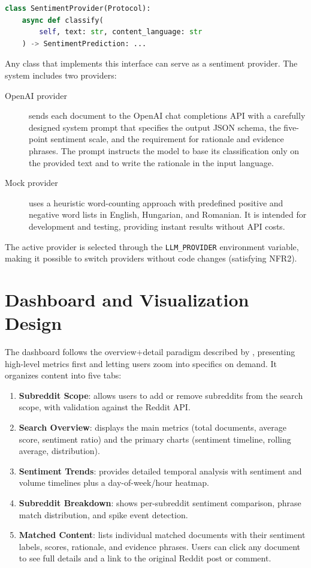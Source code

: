 \begin{lstlisting}[language=Python, caption={Sentiment provider protocol}]
class SentimentProvider(Protocol):
    async def classify(
        self, text: str, content_language: str
    ) -> SentimentPrediction: ...
\end{lstlisting}

Any class that implements this interface can serve as a sentiment provider. The system includes two providers:

\begin{description}
    \item[OpenAI provider] sends each document to the OpenAI chat completions API with a carefully designed system prompt that specifies the output JSON schema, the five-point sentiment scale, and the requirement for rationale and evidence phrases. The prompt instructs the model to base its classification only on the provided text and to write the rationale in the input language.

    \item[Mock provider] uses a heuristic word-counting approach with predefined positive and negative word lists in English, Hungarian, and Romanian. It is intended for development and testing, providing instant results without API costs.
\end{description}

The active provider is selected through the \texttt{LLM\_PROVIDER} environment variable, making it possible to switch providers without code changes (satisfying NFR2).

\section{Dashboard and Visualization Design}
\label{sec:dashboard_design}

The dashboard follows the overview+detail paradigm described by , presenting high-level metrics first and letting users zoom into specifics on demand. It organizes content into five tabs:

\begin{enumerate}
    \item \textbf{Subreddit Scope}: allows users to add or remove subreddits from the search scope, with validation against the Reddit API.
    \item \textbf{Search Overview}: displays the main metrics (total documents, average score, sentiment ratio) and the primary charts (sentiment timeline, rolling average, distribution).
    \item \textbf{Sentiment Trends}: provides detailed temporal analysis with sentiment and volume timelines plus a day-of-week/hour heatmap.
    \item \textbf{Subreddit Breakdown}: shows per-sub\-reddit sentiment comparison, phrase match distribution, and spike event detection.
    \item \textbf{Matched Content}: lists individual matched documents with their sentiment labels, scores, rationale, and evidence phrases. Users can click any document to see full details and a link to the original Reddit post or comment.
\end{enumerate}

